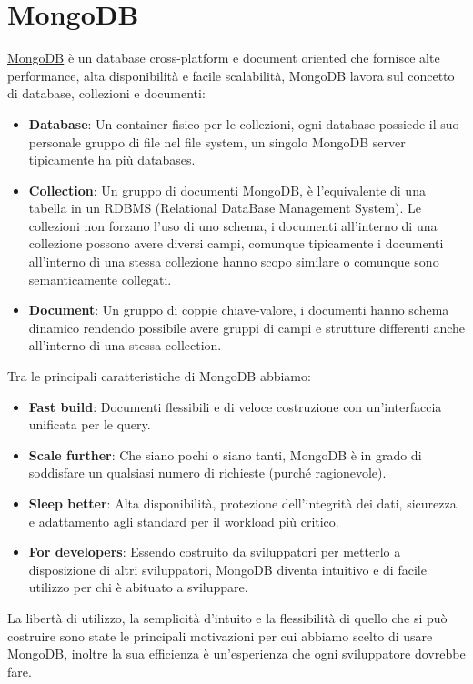 \documentclass[a4paper,12pt]{report}
\newcommand{\mongodb}{\href{https://www.mongodb.com/it-it}{MongoDB} }
\begin{document}
\section{MongoDB}\label{sub:mongo}
\mongodb è un database cross-platform e document oriented che fornisce alte performance, alta disponibilità e facile scalabilità, MongoDB lavora sul concetto di database, collezioni e documenti:
\begin{itemize}
	\item \textbf{Database}: Un container fisico per le collezioni, ogni database possiede il suo personale gruppo di file nel file system, un singolo MongoDB server tipicamente ha più databases.
	\item \textbf{Collection}: Un gruppo di documenti MongoDB, è l'equivalente di una tabella in un RDBMS (Relational DataBase Management System). Le collezioni non forzano l'uso di uno schema, i documenti all'interno di una collezione possono avere diversi campi, comunque tipicamente i documenti all'interno di una stessa collezione hanno scopo similare o comunque sono semanticamente collegati.
	\item \textbf{Document}: Un gruppo di coppie chiave-valore, i documenti hanno schema dinamico rendendo possibile avere gruppi di campi e strutture differenti anche all'interno di una stessa collection.
\end{itemize}
Tra le principali caratteristiche di MongoDB abbiamo:
\begin{itemize}
	\item \textbf{Fast build}: Documenti flessibili e di veloce costruzione con un'interfaccia unificata per le query.
	\item \textbf{Scale further}: Che siano pochi o siano tanti, MongoDB è in grado di soddisfare un qualsiasi numero di richieste (purché ragionevole).
	\item \textbf{Sleep better}: Alta disponibilità, protezione dell'integrità dei dati, sicurezza e adattamento agli standard per il workload più critico.
	\item \textbf{For developers}: Essendo costruito da sviluppatori per metterlo a disposizione di altri sviluppatori, MongoDB diventa intuitivo e di facile utilizzo per chi è abituato a sviluppare.
\end{itemize}
La libertà di utilizzo, la semplicità d'intuito e la flessibilità di quello che si può costruire sono state le principali motivazioni per cui abbiamo scelto di usare MongoDB, inoltre la sua efficienza è un'esperienza che ogni sviluppatore dovrebbe fare.
\end{document}
